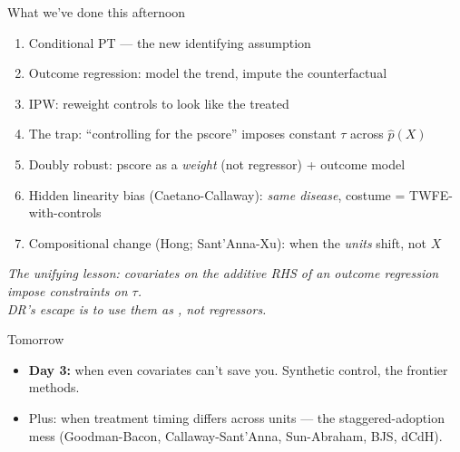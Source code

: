 \documentclass[aspectratio=169,11pt]{beamer}
\begin{document}
\begin{frame}{What we've done this afternoon}
\vspace{0.3em}
\begin{enumerate}\small
  \item Conditional PT --- the new identifying assumption
  \item Outcome regression: model the trend, impute the counterfactual
  \item IPW: reweight controls to look like the treated
  \item The trap: ``controlling for the pscore'' imposes constant $\tau$ across $\widehat{p}(X)$
  \item Doubly robust: pscore as a \textit{weight} (not regressor) + outcome model
  \item Hidden linearity bias (Caetano-Callaway): \textit{same disease}, costume = TWFE-with-controls
  \item Compositional change (Hong; Sant'Anna-Xu): when the \textit{units} shift, not $X$
\end{enumerate}
\vspace{0.5em}
\begin{center}
\small\color{warmgray}\itshape
The unifying lesson: covariates on the additive RHS of an outcome regression impose constraints on $\tau$. \\
DR's escape is to use them as , not regressors.
\end{center}
\end{frame}

\begin{frame}{Tomorrow}
\vspace{0.4em}
\begin{itemize}
  \item \textbf{Day 3:} when even covariates can't save you. Synthetic control, the frontier methods.
  \item Plus: when treatment timing differs across units --- the staggered-adoption mess (Goodman-Bacon, Callaway-Sant'Anna, Sun-Abraham, BJS, dCdH).
\end{itemize}
\end{frame}

\begin{frame}[plain]
\end{frame}
\end{document}
